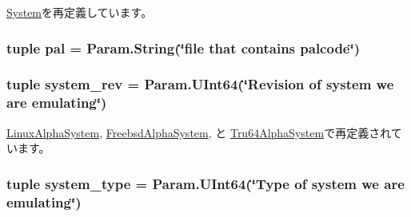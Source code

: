 \hyperlink{classSystem_1_1System_ae97427a4073448718c4d7c3df3b53143}{System}を再定義しています。\hypertarget{classAlphaSystem_1_1AlphaSystem_a7fa215a0a8f10398c16257e0c8534514}{
\subsubsection[{pal}]{\setlength{\rightskip}{0pt plus 5cm}tuple {\bf pal} = Param.String(\char`\"{}file that contains palcode\char`\"{})}}
\label{classAlphaSystem_1_1AlphaSystem_a7fa215a0a8f10398c16257e0c8534514}
\hypertarget{classAlphaSystem_1_1AlphaSystem_a0f86e3835b8bf2135faf7b1bab968494}{
\subsubsection[{system\_\-rev}]{\setlength{\rightskip}{0pt plus 5cm}tuple system\_\-rev = Param.UInt64(\char`\"{}Revision of system we are emulating\char`\"{})}}
\label{classAlphaSystem_1_1AlphaSystem_a0f86e3835b8bf2135faf7b1bab968494}


\hyperlink{classAlphaSystem_1_1LinuxAlphaSystem_a261e4081ddd1f0823eccc0f042086c27}{LinuxAlphaSystem}, \hyperlink{classAlphaSystem_1_1FreebsdAlphaSystem_a261e4081ddd1f0823eccc0f042086c27}{FreebsdAlphaSystem}, と \hyperlink{classAlphaSystem_1_1Tru64AlphaSystem_a261e4081ddd1f0823eccc0f042086c27}{Tru64AlphaSystem}で再定義されています。\hypertarget{classAlphaSystem_1_1AlphaSystem_af401252d15d9cecde29d1fdcbaba250d}{
\subsubsection[{system\_\-type}]{\setlength{\rightskip}{0pt plus 5cm}tuple system\_\-type = Param.UInt64(\char`\"{}Type of system we are emulating\char`\"{})}}
\label{classAlphaSystem_1_1AlphaSystem_af401252d15d9cecde29d1fdcbaba250d}


